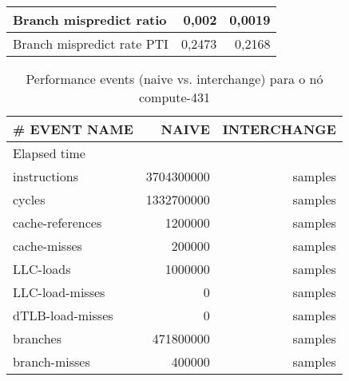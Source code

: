 \documentclass[conference,compsoc]{IEEEtran}
\begin{document}
\begin{table}[H]
\begin{tabular}{ | l | r | r |   }
  Branch mispredict ratio	 & 0,002   &     0,0019  \\ \hline      

  
  Branch mispredict rate PTI	 &  0,2473   &   0,2168    \\ \hline          
   
     \end{tabular}
  \end{table}
  
  
 \begin{table}[H]
  \caption{Performance events (naive vs. interchange) para o nó compute-431}
  \label{table:search_events}
  \centering
  \begin{tabular}{ | l | r | r |   }

  \hline
  \# EVENT NAME	 & NAIVE  & INTERCHANGE \\ \hline 
   Elapsed time & &  \\ \hline    
  instructions	& 3704300000 &  samples \\ \hline    
cycles	& 1332700000 &  samples \\ \hline    
cache-references	& 1200000 &  samples \\ \hline    
cache-misses	& 200000 &  samples \\ \hline    
LLC-loads	& 1000000 &  samples \\ \hline    
LLC-load-misses	& 0 &  samples \\ \hline    
dTLB-load-misses	& 0 &  samples \\ \hline    
branches	& 471800000 &  samples \\ \hline    
branch-misses	& 400000 &  samples \\ \hline    

  \end{tabular}
  \end{table}
\end{document}
